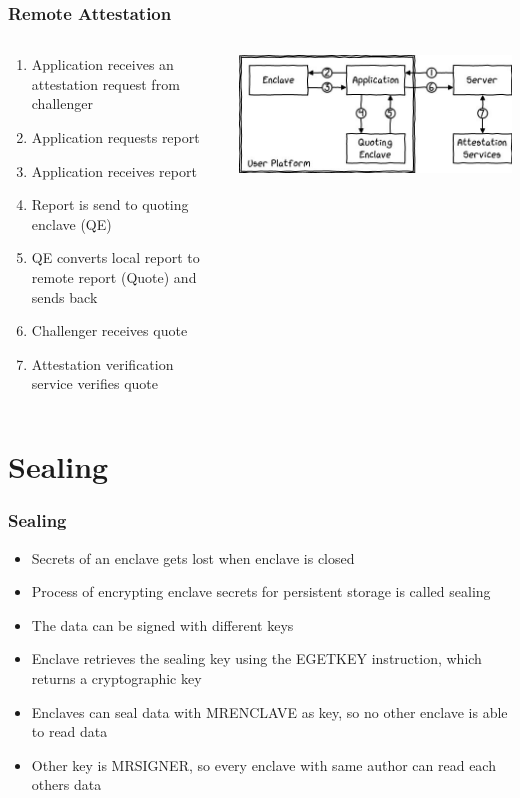 \begin{frame}
    \frametitle{Remote Attestation}
    \begin{columns}
        \begin{column}{0.4\textwidth}
            \begin{enumerate}[<+->]
                \item Application receives an attestation request from challenger
                \item Application requests report
                \item Application receives report
                \item Report is send to quoting enclave (QE)
                \item QE converts local report to remote report (Quote) and sends back
                \item Challenger receives quote
                \item Attestation verification service verifies quote
            \end{enumerate}
        \end{column}
        \begin{column}{0.6\textwidth}
            \includegraphics[scale=0.4]{Images/remote_attestation.png}
        \end{column}
    \end{columns}
\end{frame}

\section{Sealing}

\begin{frame}
    \frametitle{Sealing}
    \begin{itemize}[<+->]
        \item Secrets of an enclave gets lost when enclave is closed
        \item Process of encrypting enclave secrets for persistent storage is called sealing
        \item The data can be signed with different keys
        \item Enclave retrieves the sealing key using the EGETKEY instruction, which returns a cryptographic key
        \item Enclaves can seal data with MRENCLAVE as key, so no other enclave is able to read data
        \item Other key is MRSIGNER, so every enclave with same author can read each others data
    \end{itemize}
\end{frame}